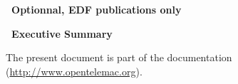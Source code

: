 \vspace*{0.1cm}
\begin{center}
\textbf{\large\ Optionnal, EDF publications only}
\end{center}
%
\vspace*{0.1cm}
\begin{center}
\textbf{\large\ Executive Summary}
\end{center}
\vspace*{1cm}

\vspace{0.5cm}
% 
The present document is part of the \opentelemac documentation (\url{http://www.opentelemac.org}).
%
%

